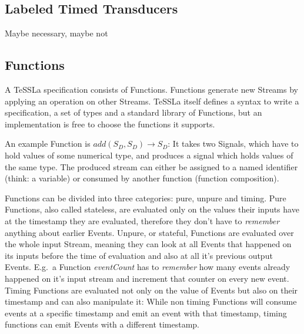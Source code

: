 
\subsection{Labeled Timed Transducers}
Maybe necessary, maybe not


\subsection{Functions}
\label{sec:concepts:defs:functions}

A TeSSLa specification consists of Functions.
Functions generate new Streams by applying an operation on other Streams.
TeSSLa itself defines a syntax to write a specification, a set of types and a standard library of Functions, but an implementation is free to choose the functions it supports.

An example Function is \(add(S_D,S_D) \rightarrow S_D\): It takes two Signals, which have to hold values of some numerical type, and produces a signal which holds values of the same type.
The produced stream can either be assigned to a named identifier (think: a variable) or consumed by another function (function composition).

Functions can be divided into three categories: pure, unpure and timing.
Pure Functions, also called stateless, are evaluated only on the values their inputs have at the timestamp they are evaluated, therefore they don't have to \emph{remember} anything about earlier Events.
Unpure, or stateful, Functions are evaluated over the whole input Stream, meaning they can look at all Events that happened on its inputs before the time of evaluation and also at all it's previous output Events.
E.g.\ a Function \emph{eventCount} has to \emph{remember} how many events already happened on it's input stream and increment that counter on every new event.
Timing Functions are evaluated not only on the value of Events but also on their timestamp and can also manipulate it:
While non timing Functions will consume events at a specific timestamp and emit an event with that timestamp, timing functions can emit Events with a different timestamp.


